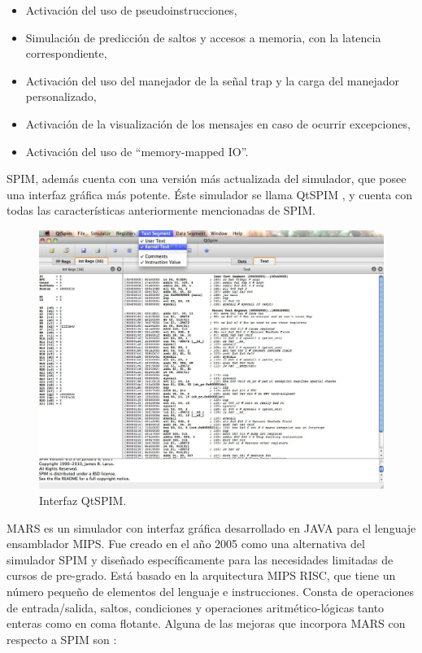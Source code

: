 \begin{itemize}

\item Activación del uso de pseudoinstrucciones,

\item Simulación de predicción de saltos y accesos a memoria, con la latencia correspondiente,

\item Activación del uso del manejador de la señal trap y la carga del manejador personalizado,

\item Activación de la visualización de los mensajes en caso de ocurrir excepciones,

\item Activación del uso de ``memory-mapped IO''.

\end{itemize}

SPIM, además cuenta con una versión más actualizada del simulador, que posee una interfaz gráfica más potente. Éste simulador se llama QtSPIM \cite{aguilar2013simuladores}, y cuenta con todas las características anteriormente mencionadas de SPIM.

\begin{figure}[htbp]
 	\centering
 	\includegraphics[width=12cm]{figures/qtspim_figure}
 	\caption{Interfaz QtSPIM.}
	\label{fig:qtspim_figure}
\end{figure}

MARS \cite{vollmar2006mars} es un simulador con interfaz gráfica desarrollado en JAVA para el lenguaje ensamblador MIPS. Fue creado en el año 2005 como una alternativa del simulador SPIM y diseñado específicamente para las necesidades limitadas de cursos de pre-grado. Está basado en la arquitectura MIPS RISC, que tiene un número pequeño de elementos del lenguaje e instrucciones. Consta de operaciones de entrada/salida, saltos, condiciones y operaciones aritmético-lógicas tanto enteras como en coma flotante. Alguna de las mejoras que incorpora MARS con respecto a SPIM son \cite{vegdahl2008mipspilot}: 

